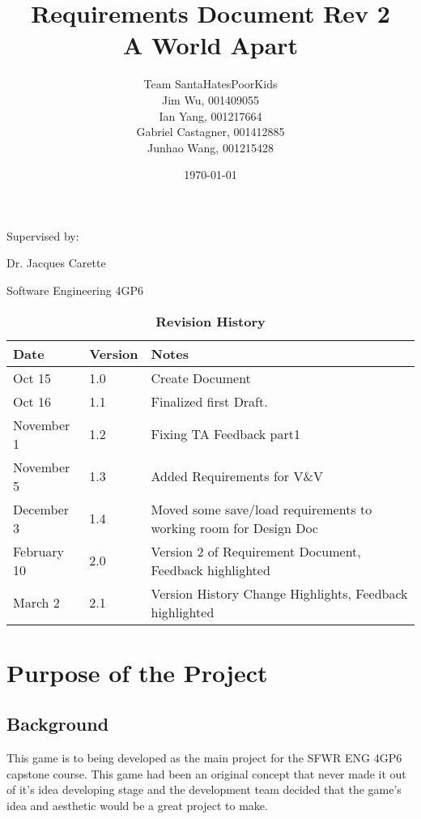 \documentclass{article}
\title{Requirements Document Rev 2\\A World Apart}
\author{Team SantaHatesPoorKids
		\\ Jim Wu, 001409055
		\\ Ian Yang, 001217664
		\\ Gabriel Castagner, 001412885
		\\ Junhao Wang, 001215428
}
\date{\today}
\begin{document}
\begin{titlepage}
\maketitle
\vfill
{\centering
Supervised by:\par 
Dr. Jacques Carette \par
Software Engineering 4GP6 \par
\begin{table}[bp]
\caption{\bf Revision History}
\begin{tabularx}{\textwidth}{p{3cm}p{2cm}X}
\toprule {\bf Date} & {\bf Version} & {\bf Notes}\\
\midrule
Oct 15 & 1.0 & Create Document\\
Oct 16 & 1.1 & Finalized first Draft.\\
November 1 & 1.2 & Fixing TA Feedback part1\\
November 5 & 1.3 &Added Requirements for V\&V\\
December 3 & 1.4 &Moved some save/load requirements to working room for Design Doc\\
February 10 & 2.0 &Version 2 of Requirement Document, Feedback highlighted\\
March 2 & 2.1 &Version History Change Highlights, Feedback highlighted\\
\bottomrule
\end{tabularx}
\end{table}
}

\end{titlepage}


\tableofcontents
\newpage


\section{Purpose of the Project}
\subsection{Background}

\quad This game is to being developed as the main project for the SFWR ENG 4GP6 capstone course. This game had been an original concept that never made it out of it's idea developing stage and the development team decided that the game's idea and aesthetic would be a great project to make.
\end{document}
